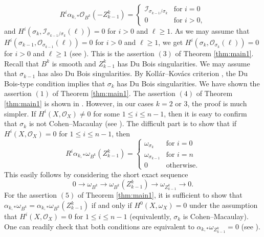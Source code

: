 \documentclass{amsart}
\theoremstyle{plain}
\theoremstyle{definition}
\theoremstyle{remark}
\begin{document}
$$
R^i \alpha_{k,*} \mathcal{O}_{B^k}(-Z_{k-1}^k) = \begin{cases} \mathscr{I}_{\sigma_{k-1}/\sigma_k} & \text{for $i=0$} \\ 0 & \text{for $i>0$} ,\end{cases}
$$
and $H^i(\sigma_k, \mathscr{I}_{\sigma_{k-1}/\sigma_k}(\ell))=0$ for $i>0$ and $\ell \geq 1$. As we may assume that $H^i(\sigma_{k-1}, \mathcal{O}_{\sigma_{k-1}}(\ell))=0$ for $i>0$ and $\ell \geq 1$, we get $H^i(\sigma_k, \mathcal{O}_{\sigma_k}(\ell))=0$ for $i>0$ and $\ell \geq 1$ (see \cite[Theorem 5.4]{Choi.Lacini.Park.Sheridan.25}). This is the assertion $(3)$ of Theorem \ref{thm:main1}. Recall that $B^k$ is smooth and $Z_{k-1}^k$ has Du Bois singularities. We may assume that $\sigma_{k-1}$ has also Du Bois singularities. By Koll\'{a}r--Kov\'{a}cs criterion \cite[Corollary 6.28]{Kollar.13}, the Du Bois-type condition implies that $\sigma_k$ has Du Bois singularities. We have shown the assertion $(1)$ of Theorem \ref{thm:main1}.
The assertion $(4)$ of Theorem \ref{thm:main1} is shown in \cite[Subsections 5.3 and 5.4]{Choi.Lacini.Park.Sheridan.25}. However, in our cases $k=2$ or $3$, the proof is much simpler. If $H^i(X, \mathcal{O}_X) \neq 0$ for some $1 \leq i \leq n-1$, then it is easy to confirm that $\sigma_k$ is not Cohen--Macaulay (see \cite[Proposition 5.19]{Choi.Lacini.Park.Sheridan.25}). The difficult part is to show that if $H^i(X, \mathcal{O}_X)=0$ for $1 \leq i \leq n-1$, then 
$$
R^i \alpha_{k,*} \omega_{B^k}(Z_{k-1}^k) = 
\begin{cases} \omega_{\sigma_k} & \text{for $i=0$} \\ \omega_{\sigma_{k-1}} & \text{for $i=n$} \\ 0 & \text{otherwise}. \end{cases}
$$
This easily follows by considering the short exact sequence
$$
0 \longrightarrow \omega_{B^k} \longrightarrow \omega_{B^k}(Z_{k-1}^k) \longrightarrow \omega_{Z_{k-1}^k} \longrightarrow 0. 
$$
For the assertion $(5)$ of Theorem \ref{thm:main1}, it is sufficient to show that $\alpha_{k,*} \omega_{B^k} = \alpha_{k,*} \omega_{B^k}(Z_{k-1}^k)$ if and only if $H^0(X, \omega_X)=0$ under the assumption that $H^i(X, \mathcal{O}_X)=0$ for $1 \leq i \leq n-1$ (equivalently, $\sigma_k$ is Cohen--Macaulay). One can readily check that both conditions are equivalent to $\alpha_{k,*} \omega_{Z_{k-1}^k}=0$ (see \cite[Theorem 5.29]{Choi.Lacini.Park.Sheridan.25}). 
\end{document}
